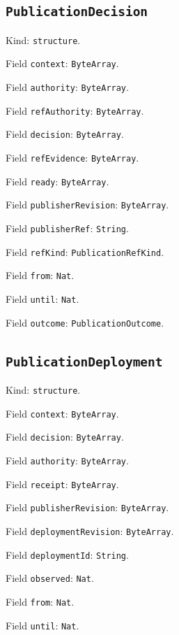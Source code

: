 \documentclass[11pt]{article}
\begin{document}
\subsection*{\texttt{PublicationDecision}}
\noindent Kind: \texttt{structure}.\par
\noindent Field \texttt{context}: \texttt{ByteArray}.\par
\noindent Field \texttt{authority}: \texttt{ByteArray}.\par
\noindent Field \texttt{refAuthority}: \texttt{ByteArray}.\par
\noindent Field \texttt{decision}: \texttt{ByteArray}.\par
\noindent Field \texttt{refEvidence}: \texttt{ByteArray}.\par
\noindent Field \texttt{ready}: \texttt{ByteArray}.\par
\noindent Field \texttt{publisherRevision}: \texttt{ByteArray}.\par
\noindent Field \texttt{publisherRef}: \texttt{String}.\par
\noindent Field \texttt{refKind}: \texttt{PublicationRefKind}.\par
\noindent Field \texttt{from}: \texttt{Nat}.\par
\noindent Field \texttt{until}: \texttt{Nat}.\par
\noindent Field \texttt{outcome}: \texttt{PublicationOutcome}.\par
\subsection*{\texttt{PublicationDeployment}}
\noindent Kind: \texttt{structure}.\par
\noindent Field \texttt{context}: \texttt{ByteArray}.\par
\noindent Field \texttt{decision}: \texttt{ByteArray}.\par
\noindent Field \texttt{authority}: \texttt{ByteArray}.\par
\noindent Field \texttt{receipt}: \texttt{ByteArray}.\par
\noindent Field \texttt{publisherRevision}: \texttt{ByteArray}.\par
\noindent Field \texttt{deploymentRevision}: \texttt{ByteArray}.\par
\noindent Field \texttt{deploymentId}: \texttt{String}.\par
\noindent Field \texttt{observed}: \texttt{Nat}.\par
\noindent Field \texttt{from}: \texttt{Nat}.\par
\noindent Field \texttt{until}: \texttt{Nat}.\par
\end{document}
